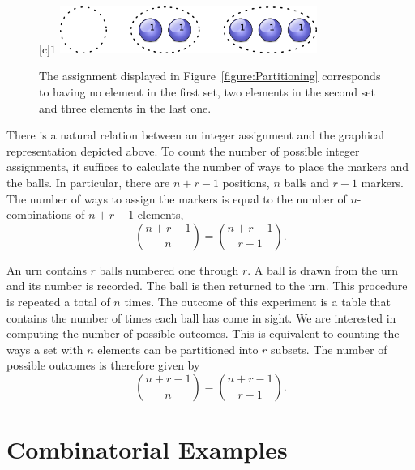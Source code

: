 \begin{figure}[htb!]
\begin{center}
\begin{psfrags}
[c]{$1$}
\includegraphics[height=1.53cm]{Figures/4Chapter/partitioning2}
\end{psfrags}
\caption{The assignment displayed in Figure~\ref{figure:Partitioning} corresponds to having no element in the first set, two elements in the second set and three elements in the last one.}
\label{figure:Partitioning2}
\end{center}
\end{figure}

There is a natural relation between an integer assignment and the graphical representation depicted above.
To count the number of possible integer assignments, it suffices to calculate the number of ways to place the markers and the balls.
In particular, there are $n + r - 1$ positions, $n$ balls and $r - 1$ markers.
The number of ways to assign the markers is equal to the number of $n$-combinations of $n + r - 1$ elements,
\begin{equation*}
\binom{n + r - 1}{n} = \binom{n + r - 1}{r - 1} .
\end{equation*}

\begin{example}
An urn contains $r$ balls numbered one through $r$.
A ball is drawn from the urn and its number is recorded.
The ball is then returned to the urn.
This procedure is repeated a total of $n$ times.
The outcome of this experiment is a table that contains the number of times each ball has come in sight.
We are interested in computing the number of possible outcomes.
This is equivalent to counting the ways a set with $n$ elements can be partitioned into $r$ subsets.
The number of possible outcomes is therefore given by
\begin{equation*}
\binom{n + r - 1}{n} = \binom{n + r - 1}{r - 1} .
\end{equation*}
\end{example}


\section{Combinatorial Examples}

